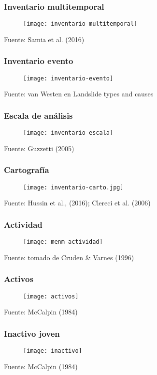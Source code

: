 \documentclass[12pt]{beamer}
\begin{document}
\begin{frame}
\frametitle{Inventario multitemporal}
\begin{figure}
   	\texttt{[image: inventario-multitemporal]}
\end{figure}
\tiny{Fuente: Samia et al. (2016)}
\end{frame}
\begin{frame}
\frametitle{Inventario evento}
\begin{figure}
   	\texttt{[image: inventario-evento]}
\end{figure}
\tiny{Fuente: van Westen en Landslide types and causes}
\end{frame}
\begin{frame}
\frametitle{Escala de análisis}
\begin{figure}
   	\texttt{[image: inventario-escala]}
\end{figure}
\tiny{Fuente: Guzzetti (2005)}
\end{frame}
\begin{frame}
\frametitle{Cartografía}
\begin{figure}
   	\texttt{[image: inventario-carto.jpg]}
\end{figure}
\tiny{Fuente: Hussin et al., (2016); Clereci et al. (2006)}
\end{frame}
\begin{frame}
\frametitle{Actividad}
\begin{figure}
   	\texttt{[image: menm-actividad]}
\end{figure}
\tiny{Fuente: tomado de Cruden \& Varnes (1996)}
\end{frame}
\begin{frame}
\frametitle{Activos}
\begin{figure}
   	\texttt{[image: activos]}
\end{figure}
\tiny{Fuente: McCalpin (1984)}
\end{frame}
\begin{frame}
\frametitle{Inactivo joven}
\begin{figure}
   	\texttt{[image: inactivo]}
\end{figure}
\tiny{Fuente: McCalpin (1984)}
\end{frame}
\end{document}
